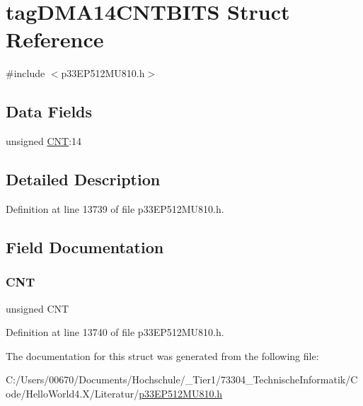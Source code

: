 \hypertarget{structtag_d_m_a14_c_n_t_b_i_t_s}{}\section{tag\+D\+M\+A14\+C\+N\+T\+B\+I\+TS Struct Reference}
\label{structtag_d_m_a14_c_n_t_b_i_t_s}


{\ttfamily \#include $<$p33\+E\+P512\+M\+U810.\+h$>$}

\subsection*{Data Fields}
\begin{DoxyCompactItemize}
\item 
unsigned \hyperlink{structtag_d_m_a14_c_n_t_b_i_t_s_a30be39d82c244f19fd98dd74227487f6}{C\+NT}\+:14
\end{DoxyCompactItemize}


\subsection{Detailed Description}


Definition at line 13739 of file p33\+E\+P512\+M\+U810.\+h.



\subsection{Field Documentation}
\mbox{\label{structtag_d_m_a14_c_n_t_b_i_t_s_a30be39d82c244f19fd98dd74227487f6}} 
\subsubsection{\texorpdfstring{C\+NT}{CNT}}
{\footnotesize\ttfamily unsigned C\+NT}



Definition at line 13740 of file p33\+E\+P512\+M\+U810.\+h.



The documentation for this struct was generated from the following file\+:\begin{DoxyCompactItemize}
\item 
C\+:/\+Users/00670/\+Documents/\+Hochschule/\+\_\+\+Tier1/73304\+\_\+\+Technische\+Informatik/\+Code/\+Hello\+World4.\+X/\+Literatur/\hyperlink{p33_e_p512_m_u810_8h}{p33\+E\+P512\+M\+U810.\+h}\end{DoxyCompactItemize}
